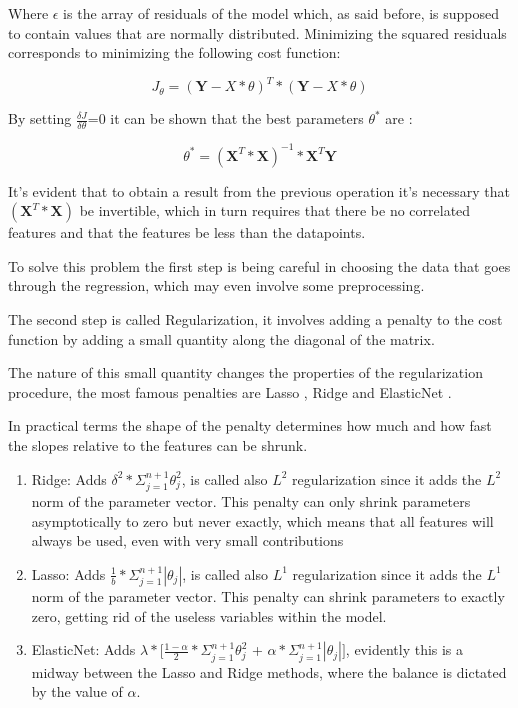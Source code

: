 Where $\epsilon$ is the array of residuals of the model which, as said before, is supposed to contain values that are normally distributed. Minimizing the squared residuals corresponds to minimizing the following cost function:

\begin{equation}
J_{\theta} =   (\textbf{Y} - \textbf{$X*\theta$})^T*(\textbf{Y} - \textbf{$X*\theta$})
\end{equation}

By setting $\frac{\delta J}{\delta \theta}$=0 it can be shown that the best parameters \textbf{$\theta^*$} are :

\begin{equation}
\textbf{$\theta^*$}=    (\textbf{X}^T* \textbf{X})^{-1}*\textbf{X}^T\textbf{Y}
\end{equation}

It's evident that to obtain a result from the previous operation it's necessary that $(\textbf{X}^T* \textbf{X})$ be invertible, which in turn requires that there be no correlated features and that the features be less than the datapoints. 

To solve this problem  the first step is being careful in choosing the data that goes through the regression, which may even involve some preprocessing.

The second step is called Regularization, it involves adding a penalty to the cost function by adding a small quantity along the diagonal of the matrix. 

The nature of this small quantity changes the properties of the regularization procedure, the most famous penalties are Lasso \cite{Lasso}, Ridge \cite{Ridge} and ElasticNet \cite{ElasticNet}.

In practical terms the shape of the penalty determines how much and how fast the slopes relative to the features can be shrunk.

\begin{enumerate}
\item Ridge: Adds $\delta^2 * \Sigma^{n+1}_{j=1} \theta_j^2$, is called also $L^2$ regularization since it adds the $L^2$ norm of the parameter vector. This penalty can only shrink parameters asymptotically to zero but never exactly, which means that all features will always be used,  even with very small contributions
\item Lasso: Adds $\frac{1}{b} * \Sigma^{n+1}_{j=1} |\theta_j|$, is called also $L^1$ regularization since it adds the $L^1$ norm of the parameter vector. This penalty can shrink parameters to exactly zero, getting rid of the useless variables within the model.
\item ElasticNet: Adds $\lambda*[\frac{1-\alpha}{2}  * \Sigma^{n+1}_{j=1} \theta_j^2$ + $\alpha* \Sigma^{n+1}_{j=1} |\theta_j|]$, evidently this is a midway between  the Lasso and Ridge methods, where the balance is dictated by the value of $\alpha$.
\end{enumerate}

